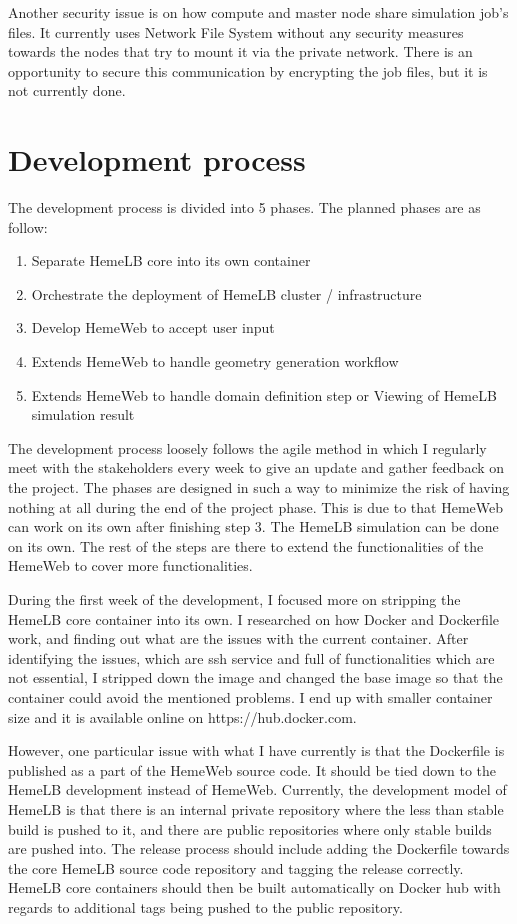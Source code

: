 Another security issue is on how compute and master node share simulation job's files. It currently uses Network File System without any security measures towards the nodes that try to mount it via the private network. There is an opportunity to secure this communication by encrypting the job files, but it is not currently done.


\section{Development process}

The development process is divided into 5 phases. The planned phases are as follow:

\begin{enumerate}
    \item{Separate HemeLB core into its own container}
    \item{Orchestrate the deployment of HemeLB cluster / infrastructure}
    \item{Develop HemeWeb to accept user input}
    \item{Extends HemeWeb to handle geometry generation workflow}
    \item{Extends HemeWeb to handle domain definition step or Viewing of HemeLB simulation result}
\end{enumerate}

The development process loosely follows the agile method in which I regularly meet with the stakeholders every week to give an update and gather feedback on the project. The phases are designed in such a way to minimize the risk of having nothing at all during the end of the project phase. This is due to that HemeWeb can work on its own after finishing step 3. The HemeLB simulation can be done on its own. The rest of the steps are there to extend the functionalities of the HemeWeb to cover more functionalities.

During the first week of the development, I focused more on stripping the HemeLB core container into its own. I researched on how Docker and Dockerfile work, and finding out what are the issues with the current container. After identifying the issues, which are ssh service and full of functionalities which are not essential, I stripped down the image and changed the base image so that the container could avoid the mentioned problems. I end up with smaller container size and it is available online on https://hub.docker.com.

However, one particular issue with what I have currently is that the Dockerfile is published as a part of the HemeWeb source code. It should be tied down to the HemeLB development instead of HemeWeb. Currently, the development model of HemeLB is that there is an internal private repository where the less than stable build is pushed to it, and there are public repositories where only stable builds are pushed into. The release process should include adding the Dockerfile towards the core HemeLB source code repository and tagging the release correctly. HemeLB core containers should then be built automatically on Docker hub with regards to additional tags being pushed to the public repository.


